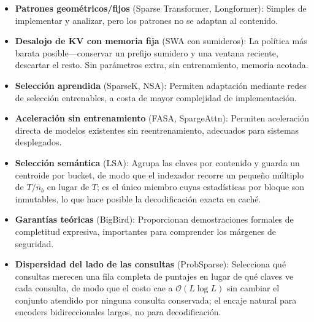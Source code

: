 \begin{itemize}[leftmargin=*]
    \item \textbf{Patrones geométricos/fijos} (Sparse Transformer, Longformer): Simples de implementar y analizar, pero los patrones no se adaptan al contenido.
    \item \textbf{Desalojo de KV con memoria fija} (SWA con sumideros): La política más barata posible---conservar un prefijo sumidero y una ventana reciente, descartar el resto. Sin parámetros extra, sin entrenamiento, memoria acotada.
    \item \textbf{Selección aprendida} (SparseK, NSA): Permiten adaptación mediante redes de selección entrenables, a costa de mayor complejidad de implementación.
    \item \textbf{Aceleración sin entrenamiento} (FASA, SpargeAttn): Permiten aceleración directa de modelos existentes sin reentrenamiento, adecuados para sistemas desplegados.
    \item \textbf{Selección semántica} (LSA): Agrupa las claves por contenido y guarda un centroide por bucket, de modo que el indexador recorre un pequeño múltiplo de $T/\bar{n}_b$ en lugar de $T$; es el único miembro cuyas estadísticas por bloque son inmutables, lo que hace posible la decodificación exacta en caché.
    \item \textbf{Garantías teóricas} (BigBird): Proporcionan demostraciones formales de completitud expresiva, importantes para comprender los márgenes de seguridad.
    \item \textbf{Dispersidad del lado de las consultas} (ProbSparse): Selecciona qué consultas merecen una fila completa de puntajes en lugar de qué claves ve cada consulta, de modo que el costo cae a $\mathcal{O}(L\log L)$ sin cambiar el conjunto atendido por ninguna consulta conservada; el encaje natural para encoders bidireccionales largos, no para decodificación.
\end{itemize}

